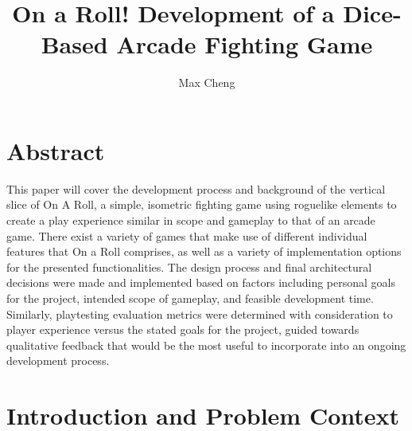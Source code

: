 \documentclass[10pt,twocolumn]{article}
\title{On a Roll! Development of a Dice-Based Arcade Fighting Game}
\author{Max Cheng}
\affiliation{Occidental College}
\begin{document}
\maketitle

\section{Abstract}

This paper will cover the development process and background  of the vertical slice of On A Roll, a simple, isometric fighting game using roguelike elements to create a play experience similar in scope and gameplay to that of an arcade game. There exist a variety of games that make use of different individual features that On a Roll comprises, as well as a variety of implementation options for the presented functionalities. The design process and final architectural decisions were made and implemented based on factors including personal goals for the project, intended scope of gameplay, and feasible development time. Similarly, playtesting evaluation metrics were determined with consideration to player experience versus the stated goals for the project, guided towards qualitative feedback that would be the most useful to incorporate into an ongoing development process.


\section{Introduction and Problem Context}
\end{document}
